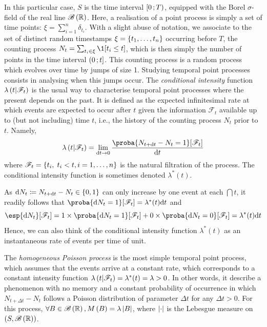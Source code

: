In this particular case, $S$ is the time interval $\left[ 0 \, ; T \right)$, equipped with the Borel $\sigma$-field of the real line $\mathscr{B}\left( \mathbb{R} \right)$.
Here, a realisation of a point process is simply a set of time points: $\xi = \sum_{i=1}^n \delta_{t_i}$.
With a slight abuse of notation, we associate to the set of distinct random timestamps $\xi = \left\lbrace t_1, \dots, t_n \right\rbrace$ occurring before $T$, the counting process $N_t = \sum_{t_i \in\xi}\1[t_i \leq t]$, which is then simply the number of points in the time interval $\left( 0 \, ; t \right]$.
This counting process is a random process which evolves over time by jumps of size 1.
Studying temporal point processes consists in analysing when this jumps occur.
The \textit{conditional intensity} function $\lambda\left( t \middle| \mathscr{F}_t \right)$ is the usual way to characterise temporal point processes where the present depends on the past.
It is defined as the expected infinitesimal rate at which events are expected to occur after $t$ given the information $\mathscr{F}_t$ available up to (but not including) time $t$, i.e., the history of the counting process $N_t$ prior to $t$.
Namely,
\begin{equation}
    \lambda\pars{t \middle| \mathscr{F}_t} = \lim_{\dint t \to 0} \frac{\proba{N_{t + \dint t} - N_t = 1}[\mathscr{F}_t]}{\dint t}
\end{equation}
where $\mathscr{F}_t = \left\lbrace t_i,\; t_i < t, i=1,\dots,n \right\rbrace$ is the natural filtration of the process.
The conditional intensity function is sometimes denoted $\lambda^*(t)$.

As $\mathrm{d} N_t \coloneqq N_{t +\mathrm{d} t} - N_t \in \left\lbrace 0,1 \right\rbrace$ can only increase by one event at each $\dint t$, it readily follows that $\proba{\dint N_t = 1}[\mathscr{F}_t] = \lambda^*(t)\dint t$ and
\begin{equation}
    \esp{\dint N_t}[\mathscr{F}_t] = 1\times \proba{\dint N_t = 1}[\mathscr{F}_t] + 0\times \proba{\dint N_t = 0}[\mathscr{F}_t] = \lambda^*(t)\dint t
\end{equation}
Hence, we can also think of the conditional intensity function $\lambda^*(t)$ as an instantaneous rate of events per time of unit.

The \textit{homogeneous Poisson process} is the most simple temporal point process, which assumes that the events arrive at a constant rate, which corresponds to a constant intensity function $\lambda\left( t \middle| \mathscr{F}_t \right) = \lambda^*(t) = \lambda > 0$.
In other words, it describe a phenomenon with no memory and a constant probability of occurrence in which $N_{t + \Delta t} - N_t$ follows a Poisson distribution of parameter $\Delta t$ for any $\Delta t > 0$.
For this process, $\forall B \in \mathscr{B}\left( \mathbb{R} \right), M\left( B \right) = \lambda \left\vert B\right\vert$, where $\left\vert \cdot\right\vert$ is the Lebesgue measure on $\left( S, \mathscr{B}\left( \mathbb{R} \right) \right)$.

